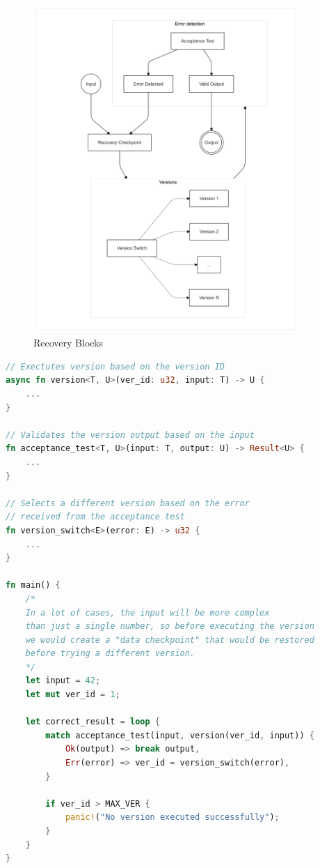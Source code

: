\documentclass[12pt, letterpaper]{article}
\begin{document}
\begin{figure}[hbt!]
    \centering
    \includegraphics[width=0.9\textwidth]{recovery_blocks/recovery_blocks_01.png}
    \caption{Recovery Blocks}
    \label{fig:rec_blo}
\end{figure}

\break

\begin{lstlisting}[language=Rust]
// Exectutes version based on the version ID
async fn version<T, U>(ver_id: u32, input: T) -> U {
    ...
}

// Validates the version output based on the input
fn acceptance_test<T, U>(input: T, output: U) -> Result<U> {
    ...
}

// Selects a different version based on the error 
// received from the acceptance test
fn version_switch<E>(error: E) -> u32 {
    ...
}

fn main() {
    /* 
    In a lot of cases, the input will be more complex 
    than just a single number, so before executing the version
    we would create a "data checkpoint" that would be restored
    before trying a different version.
    */
    let input = 42;
    let mut ver_id = 1;

    let correct_result = loop {
        match acceptance_test(input, version(ver_id, input)) {
            Ok(output) => break output,
            Err(error) => ver_id = version_switch(error),
        }

        if ver_id > MAX_VER {
            panic!("No version executed successfully");
        }
    }
}
\end{lstlisting}
\end{document}
